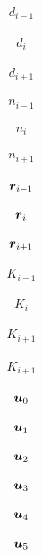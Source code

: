 \documentclass[43pt]{jsarticle}
\def\vector#1{\mbox{\boldmath \(#1\)}}
\begin{document}
\begin{eqnarray*}
  d_{i-1}
\end{eqnarray*}
\newpage

\begin{eqnarray*}
  d_{i}
\end{eqnarray*}
\newpage

\begin{eqnarray*}
  d_{i + 1}
\end{eqnarray*}
\newpage

\begin{eqnarray*}
  n_{i-1}
\end{eqnarray*}
\newpage

\begin{eqnarray*}
  n_{i}
\end{eqnarray*}
\newpage

\begin{eqnarray*}
  n_{i+1}
\end{eqnarray*}
\newpage

\begin{eqnarray*}
  \vector{r}_{i-1}
\end{eqnarray*}
\newpage

\begin{eqnarray*}
  \vector{r}_{i}
\end{eqnarray*}
\newpage

\begin{eqnarray*}
  \vector{r}_{i+1}
\end{eqnarray*}
\newpage

\begin{eqnarray*}
  K_{i-1}
\end{eqnarray*}
\newpage

\begin{eqnarray*}
  K_{i}
\end{eqnarray*}
\newpage

\begin{eqnarray*}
  K_{i+1}
\end{eqnarray*}
\newpage

\begin{eqnarray*}
  K_{i+1}
\end{eqnarray*}
\newpage

\begin{eqnarray*}
  \vector{u}_{0}
\end{eqnarray*}
\newpage

\begin{eqnarray*}
  \vector{u}_{1}
\end{eqnarray*}
\newpage

\begin{eqnarray*}
  \vector{u}_{2}
\end{eqnarray*}
\newpage

\begin{eqnarray*}
  \vector{u}_{3}
\end{eqnarray*}
\newpage

\begin{eqnarray*}
  \vector{u}_{4}
\end{eqnarray*}
\newpage

\begin{eqnarray*}
  \vector{u}_{5}
\end{eqnarray*}
\newpage
\end{document}

